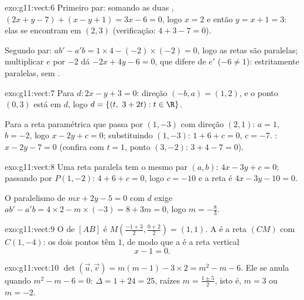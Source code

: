 \begin{solution}{exo:g11:vect:6}
Primeiro par: somando as duas ,
$(2x + y - 7) + (x - y + 1) = 3x - 6 = 0$, logo $x = 2$ e então
$y = x + 1 = 3$: elas se encontram em $(2, 3)$ (verificação:
$4 + 3 - 7 = 0$).

Segundo par: $ab' - a'b = 1 \times 4 - (-2) \times (-2) = 0$, logo as
retas são paralelas; multiplicar $e$ por $-2$ dá $-2x + 4y - 6 = 0$, que
difere de $e'$ ($-6 \neq 1$): estritamente paralelas, sem .
\end{solution}

\begin{solution}{exo:g11:vect:7}
Para $d: 2x - y + 3 = 0$: direção $(-b, a) = (1, 2)$, e o ponto $(0, 3)$
está em $d$, logo $d = \{(t,\ 3 + 2t) : t \in \R\}$.

Para a reta paramétrica que passa por $(1, -3)$ com direção $(2, 1)$:
$a = 1$, $b = -2$, logo $x - 2y + c = 0$; substituindo $(1, -3)$:
$1 + 6 + c = 0$, $c = -7$. : $x - 2y - 7 = 0$ (confira com
$t = 1$, ponto $(3, -2)$: $3 + 4 - 7 = 0$).
\end{solution}

\begin{solution}{exo:g11:vect:8}
Uma reta paralela tem o mesmo par $(a, b)$: $4x - 3y + c = 0$; passando
por $P(1, -2)$: $4 + 6 + c = 0$, logo $c = -10$ e a reta é
$4x - 3y - 10 = 0$.

O paralelismo de $mx + 2y - 5 = 0$ com $d$ exige
$ab' - a'b = 4 \times 2 - m \times (-3) = 8 + 3m = 0$, logo
$m = -\frac83$.
\end{solution}

\begin{solution}{exo:g11:vect:9}
O  de $[AB]$ é
$M\!\left(\frac{-1+3}{2}, \frac{0+2}{2}\right) = (1, 1)$. A  é a
reta $(CM)$ com $C(1, -4)$: os dois pontos têm  $1$, de modo que
a  é a reta vertical
\[
x - 1 = 0 .
\]
\end{solution}

\begin{solution}{exo:g11:vect:10}
$\det(\vec u, \vec v) = m(m - 1) - 3 \times 2 = m^2 - m - 6$. Ele se
anula quando $m^2 - m - 6 = 0$: $\Delta = 1 + 24 = 25$, raízes
$m = \frac{1 \pm 5}{2}$, isto é, $m = 3$ ou $m = -2$.
\end{solution}

